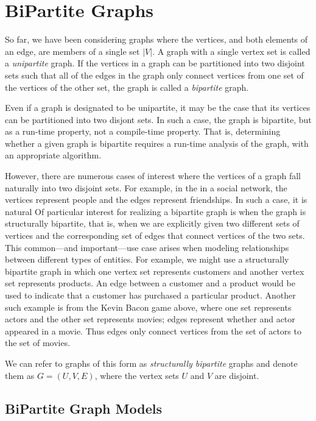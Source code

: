 \section{BiPartite Graphs}

So far, we have been considering graphs where the vertices, and both elements of an
edge, are members of a single set $|V|$. A graph with a single vertex set is called a
\emph{unipartite} graph. If the vertices in a graph can be partitioned into two
disjoint sets such that all of the edges in the graph only connect vertices from one
set of the vertices of the other set, the graph is called a \emph{bipartite} graph.

Even if a graph is designated to be unipartite, it may be the case that its vertices
can be partitioned into two disjont sets. In such a case, the graph is bipartite,
but as a run-time property, not a compile-time property.
That is, determining whether a given graph is bipartite requires a run-time analysis
of the graph, with an appropriate algorithm.

However, there are numerous cases of interest where the vertices of a graph fall
naturally into two disjoint sets. For example, in the
in a social network, the vertices
represent people and the edges represent friendships. In such a case, it is natural
Of particular interest for realizing a bipartite graph is when the graph is
structurally bipartite, that is, when we are explicitly given two different
sets of vertices and the corresponding set of edges that connect vertices of the two sets.
This common---and important---use case arises when modeling relationships
between different types of entities. For example, we might use a structurally
bipartite graph in which one vertex set represents customers and another vertex
set represents products. An edge between a customer and a product would be used
to indicate that a customer has purchased a particular product.
Another such example is from the Kevin Bacon game above, where
one set represents actors and the other set represents movies; edges represent whether
and actor appeared in a movie. Thus edges only connect vertices from the set of actors
to the set of movies.

We can refer to graphs of this form as \emph{structurally bipartite} graphs and
denote them as $G = (U, V, E)$, where the vertex sets $U$ and $V$ are disjoint.

\subsection{BiPartite Graph Models}

